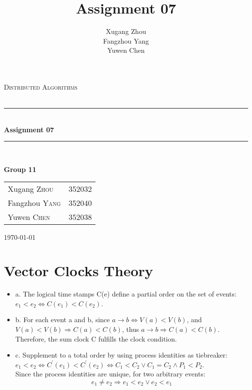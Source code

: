 \documentclass[a4paper, 14pt]{article}
\title{\bf Assignment 07}
\author{Xugang Zhou \\ Fangzhou Yang \\ Yuwen Chen}
\newcommand{\HRule}{\rule{\linewidth}{0.5mm}}
\begin{document}
\begin{titlepage}
\begin{center}
\vfill
\textsc{\LARGE Distributed Algorithms}\\[1.5cm]
\textsc{\Large }\\[0.5cm]

\HRule \\[0.4cm]
{\huge \bfseries Assignment 07}\\[0.4cm]
\HRule \\[1.5cm]
\begin{minipage}{0.4\textwidth}
\begin{flushleft} \large
\large{\textbf{Group 11}}
\end{flushleft}
\end{minipage}
\begin{minipage}{0.4\textwidth}
\begin{flushright} \large
\begin{tabular}{ll}
Xugang \textsc{Zhou} & 352032\\
Fangzhou \textsc{Yang} & 352040\\
Yuwen \textsc{Chen} & 352038
\end{tabular}
\end{flushright}
\end{minipage}
\vfill
{\large \today}\\
\end{center}
\end{titlepage}
\thispagestyle{fancy}

\section{Vector Clocks Theory}
\begin{itemize}
\item a. The logical time stamps C(e) define a partial order on the set of events: $e_1<e_2 \Leftrightarrow C(e_1) < C(e_2)$.
\item b. For each event a and b, since $a \rightarrow b \Leftrightarrow V(a) < V(b)$, and $V(a)<V(b) \Rightarrow C(a)<C(b)$, thus $a \rightarrow b \Rightarrow C(a)<C(b)$. Therefore, the sum clock C fulfills the clock condition.
\item c. Supplement to a total order by using process identities as tiebreaker: $e_1 < e_2 \Leftrightarrow C^{'}(e_1)<C^{'}(e_2) \Leftrightarrow C_1 < C_2 \vee C_1 = C_2 \wedge P_1 < P_2$. \\
    Since the process identities are unique, for two arbitrary events: $$e_1 \ne e_2 \Rightarrow e_1 < e_2 \vee e_2 < e_1$$
\end{itemize}
\end{document}
